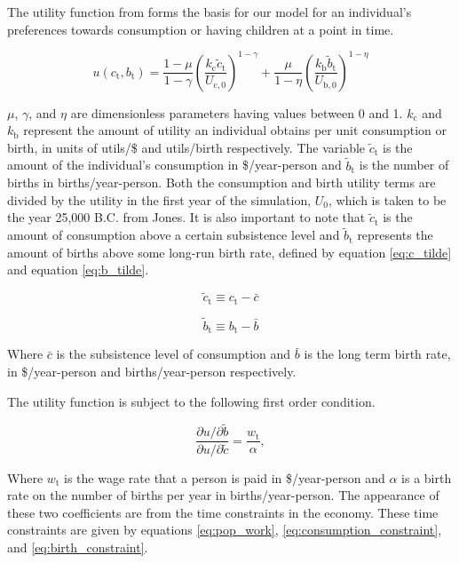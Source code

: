 \documentclass[letterpaper,12pt]{article}
\begin{document}
The utility function from \citet{Jones2001} forms the basis for our model for an individual's preferences towards consumption or having children at a point in time.

\begin{equation} \label{eq:utility_function}
	u(c_\mathrm{t}, b_\mathrm{t}) = \frac{1-\mu}{1-\gamma} \left(\frac{k_\mathrm{c} \tilde c_\mathrm{t}}{U_\mathrm{c,0}} \right)^{1-\gamma} + \frac{\mu}{1-\eta} \left(\frac{k_\mathrm{b} \tilde b_\mathrm{t}}{U_\mathrm{b,0}} \right)^{1-\eta}
\end{equation}

\noindent $\mu$, $\gamma$, and $\eta$ are dimensionless parameters having values between 0 and 1. $k_\mathrm{c}$ and $k_\mathrm{b}$ represent the amount of utility an individual obtains per unit consumption or birth, in units of utils/\$ and utils/birth respectively. The variable $\tilde c_\mathrm{t}$ is the amount of the individual's consumption in \$/year-person and $\tilde b_\mathrm{t}$ is the number of births in births/year-person. Both the consumption and birth utility terms are divided by the utility in the first year of the simulation, $U_\mathrm{0}$, which is taken to be the year 25,000 B.C. from Jones. It is also important to note that $\tilde c_\mathrm{t}$ is the amount of consumption above a certain subsistence level and $\tilde b_\mathrm{t}$ represents the amount of births above some long-run birth rate, defined by equation \ref{eq:c_tilde} and equation \ref{eq:b_tilde}.

\begin{equation} \label{eq:c_tilde}
	\tilde c_\mathrm{t} \equiv c_\mathrm{t} - \bar c
\end{equation}

\begin{equation} \label{eq:b_tilde}
	\tilde b_\mathrm{t} \equiv b_\mathrm{t} - \bar b
\end{equation}

Where $\bar c$ is the subsistence level of consumption and $\bar b$ is the long term birth rate, in \$/year-person and births/year-person respectively.

The utility function is subject to the following first order condition.

\begin{equation} \label{eq:first_order_condition}
	\frac{\partial u/ \partial\tilde b}{\partial u/ \partial\tilde c} = \frac{w_\mathrm{t}}{\alpha},
\end{equation}

Where $w_\mathrm{t}$ is the wage rate that a person is paid in \$/year-person and $\alpha$ is a birth rate on the number of births per year in births/year-person. The appearance of these two coefficients are from the time constraints in the economy. These time constraints are given by equations \ref{eq:pop_work}, \ref{eq:consumption_constraint}, and \ref{eq:birth_constraint}.
\end{document}
